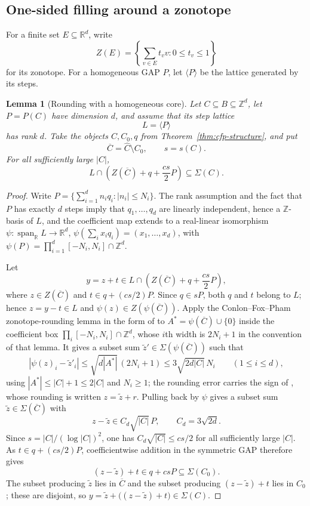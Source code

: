 \documentclass[11pt,reqno]{amsart}
\newtheorem{lemma}[theorem]{Lemma}
\theoremstyle{definition}
\theoremstyle{remark}
\newcommand{\Z}{\mathbb Z}
\newcommand{\R}{\mathbb R}
\newcommand{\SigmaSet}{\Sigma}
\begin{document}
\subsection{One-sided filling around a zonotope}

For a finite set $E\subseteq\R^d$, write
\[
 Z(E)=\left\{\sum_{v\in E}t_vv:0\le t_v\le1\right\}
\]
for its zonotope.  For a homogeneous GAP $P$, let $\langle P\rangle$ be the lattice generated by its steps.

\begin{lemma}[Rounding with a homogeneous core]
\label{lem:one-sided-filling}
Let $C\subseteq B\subseteq\Z^d$, let $P=P(C)$ have dimension $d$, and assume that its step lattice
\[
 L=\langle P\rangle
\]
has rank $d$.  Take the objects $\widehat C,C_0,q$ from Theorem~\ref{thm:cfp-structure}, and put
\[
 \overline C=\widehat C\setminus C_0,
 \qquad s=s(C).
\]
For all sufficiently large $|C|$,
\[
 L\cap\left(Z(\overline C)+q+\frac{cs}{2}P\right)
 \subseteq\SigmaSet(C).
\]
\end{lemma}

\begin{proof}
Write $P=\bigl\{\sum_{i=1}^d n_iq_i:|n_i|\le N_i\bigr\}$.  The rank
assumption and the fact that $P$ has exactly $d$ steps imply that
$q_1,\dots,q_d$ are linearly independent, hence a $\Z$-basis of $L$, and
the coefficient map extends to a real-linear isomorphism
$\psi:\operatorname{span}_{\R}L\to\R^d$,
$\psi(\sum_i x_iq_i)=(x_1,\dots,x_d)$, with
$\psi(P)=\prod_{i=1}^d[-N_i,N_i]\cap\Z^d$.

Let
\[
 y=z+t\in L\cap\left(Z(\overline C)+q+\frac{cs}{2}P\right),
\]
where $z\in Z(\overline C)$ and $t\in q+(cs/2)P$.  Since $q\in sP$, both
$q$ and $t$ belong to $L$; hence $z=y-t\in L$ and
$\psi(z)\in Z(\psi(\overline C))$.  Apply the Conlon--Fox--Pham
zonotope-rounding lemma in the form of \cite[Lemma~13]{PhamZakharov} to
$A^*=\psi(\overline C)\cup\{0\}$ inside the coefficient box
$\prod_i[-N_i,N_i]\cap\Z^d$, whose $i$th width is $2N_i+1$ in the
convention of that lemma.  It gives a subset sum
$\widetilde z'\in\SigmaSet(\psi(\overline C))$ such that
\[
 |\psi(z)_i-\widetilde z'_i|
 \le \sqrt{d|A^*|}\,(2N_i+1)
 \le 3\sqrt{2d|C|}\,N_i
 \qquad(1\le i\le d),
\]
using $|A^*|\le|C|+1\le2|C|$ and $N_i\ge1$; the rounding error carries
the sign of \cite[equation~(15)]{PhamZakharov}, whose rounding is written
$z=\widetilde z+r$.  Pulling back by $\psi$ gives a subset sum
$\widetilde z\in\SigmaSet(\overline C)$ with
\[
 z-\widetilde z\in C_d\sqrt{|C|}\,P,
 \qquad
 C_d=3\sqrt{2d}.
\]
Since $s=|C|/(\log|C|)^2$, one has $C_d\sqrt{|C|}\le cs/2$ for all
sufficiently large $|C|$.  As $t\in q+(cs/2)P$, coefficientwise addition
in the symmetric GAP therefore gives
\[
 (z-\widetilde z)+t\in q+csP\subseteq\SigmaSet(C_0).
\]
The subset producing $\widetilde z$ lies in $\overline C$ and the subset
producing $(z-\widetilde z)+t$ lies in $C_0$; these are disjoint, so
$y=\widetilde z+\bigl((z-\widetilde z)+t\bigr)\in\SigmaSet(C)$.
\end{proof}
\end{document}
